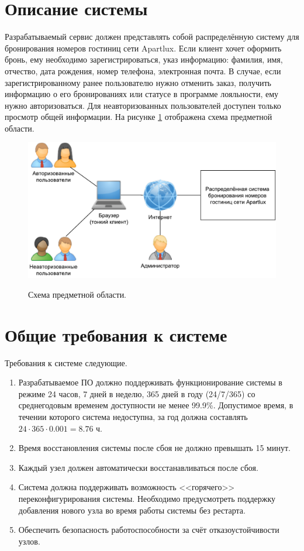 \section*{Описание системы}
Разрабатываемый сервис должен представлять собой распределённую систему для бронирования номеров гостиниц сети Apartlux. Если клиент хочет оформить бронь, ему необходимо зарегистрироваться, указ информацию: фамилия, имя, отчество, дата рождения, номер телефона, электронная почта. В случае, если зарегистрированному ранее пользователю нужно отменить заказ, получить информацию о его бронированиях или статусе в программе лояльности, ему нужно авторизоваться. Для неавторизованных пользователей доступен только просмотр общей информации. 
На рисунке \ref{fig:schema} отображена схема предметной области.
\begin{figure}[h]
	\begin{center}
		{\includegraphics[scale = 0.6]{img/pic/general.pdf}}
		\caption{Схема предметной области.}
		\label{fig:schema}
	\end{center}
\end{figure}

\pagebreak

\section*{Общие требования к системе}
Требования к системе следующие.
\begin{enumerate}
	\item Разрабатываемое ПО должно поддерживать функционирование системы в режиме 24 часов, 7 дней в неделю, 365 дней в году (24/7/365) со среднегодовым временем доступности не менее 99.9\%. Допустимое время, в течении которого система недоступна, за год должна составлять $24\cdot365\cdot0.001=8.76$ ч.
	
	\item Время восстановления системы после сбоя не должно превышать 15 минут.
	
	\item Каждый узел должен автоматически восстанавливаться после сбоя.
	
	\item Система должна поддерживать возможность <<горячего>> переконфигурирования системы. Необходимо предусмотреть поддержку добавления нового узла во время работы системы без рестарта.
	
	\item Обеспечить безопасность работоспособности за счёт отказоустойчивости узлов.
\end{enumerate}

